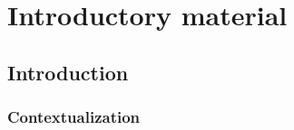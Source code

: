 
%

\part{Introductory material}

\chapter{Introduction}
\label{cha:introduction}


\epigraphfontsize{\small\itshape}
\setlength\epigraphwidth{12.5cm}
\setlength\epigraphrule{0pt}

\section{Contextualization}
\label{sec:contextualization}

